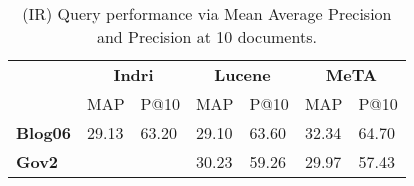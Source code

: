 \begin{table}[t]
\centering
{\small
    \begin{tabular}{|l|p{.65cm}p{.65cm}|p{.65cm}p{.65cm}|p{.65cm}p{.65cm}|}
    \hline &
    \multicolumn{2}{c|}{\textbf{Indri}} &
    \multicolumn{2}{c|}{\textbf{Lucene}} &
    \multicolumn{2}{c|}{\textbf{MeTA}} \\
    & MAP & P@10 & MAP & P@10 & MAP & P@10\\
    \hline
    \textbf{Blog06} & 29.13 & 63.20 & 29.10 & 63.60 & 32.34 & 64.70 \\
    \textbf{Gov2} & & & 30.23 & 59.26 & 29.97 & 57.43 \\
    \hline
\end{tabular}
\caption{(IR) Query performance via Mean Average Precision and Precision at 10
    documents.}
\label{table:ir-map}
}
\end{table}
